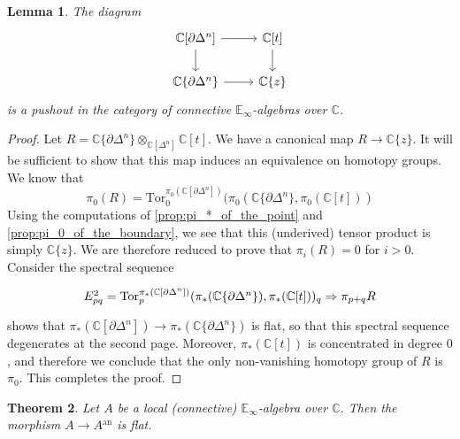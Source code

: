 \documentclass[12pt,a4paper,reqno]{amsart}
\theoremstyle{plain}
\newtheorem{thm}{Theorem}[section]
\newtheorem{lem}[thm]{Lemma}
\theoremstyle{definition}
\theoremstyle{remark}
\numberwithin{equation}{section}
\begin{document}
\begin{lem} \label{lem:analytification_boundary_pushout}
	The diagram
	\[ \begin{tikzcd}
		\mathbb C[\partial \Delta^n] \arrow{r} \arrow{d} & \mathbb C[t] \arrow{d} \\
		\mathbb C\{\partial \Delta^n\} \arrow{r} & \mathbb C \{z\}
	\end{tikzcd} \]
	is a pushout in the category of connective $\mathbb E_\infty$-algebras over $\mathbb C$.
\end{lem}
	
\begin{proof}
	Let $R = \mathbb C\{\partial \Delta^n\} \otimes_{\mathbb C[\Delta^n]} \mathbb C[t]$. We have a canonical map $R \to \mathbb C\{z\}$.
	It will be sufficient to show that this map induces an equivalence on homotopy groups.
	We know that
	\[ \pi_0(R) = {\mathrm{Tor}}^{\pi_0(\mathbb C[\partial \Delta^n])}_0( \pi_0(\mathbb C\{\partial \Delta^n\}, \pi_0(\mathbb C[t])) \]
	Using the computations of \cref{prop:pi_*_of_the_point} and \cref{prop:pi_0_of_the_boundary}, we see that this (underived) tensor product is simply $\mathbb C\{z\}$.
	We are therefore reduced to prove that $\pi_i(R) = 0$ for $i > 0$.
	Consider the spectral sequence
	\[ \begin{tikzcd}
		E^2_{pq} = {\mathrm{Tor}}^{\pi_*(\mathbb C[\partial \Delta^n])}_p( \pi_* (\mathbb C \{\partial \Delta^n\}), \pi_*(\mathbb C[t]))_q \Rightarrow \pi_{p+q}R
	\end{tikzcd} \]
	 shows that $\pi_*(\mathbb C[\partial \Delta^n]) \to \pi_*(\mathbb C\{\partial \Delta^n\})$ is flat, so that this spectral sequence degenerates at the second page.
	Moreover, $\pi_*(\mathbb C[t])$ is concentrated in degree $0$, and therefore we conclude that the only non-vanishing homotopy group of $R$ is $\pi_0$.
	This completes the proof.
	{\ignorespaces}
\end{proof}
	
\begin{thm} \label{thm:analytification_flat}
	Let $A$ be a local (connective) $\mathbb E_\infty$-algebra over $\mathbb C$.
	Then the morphism $A \to A{^\mathrm{an}}$ is flat.
\end{thm}
	
\end{document}
